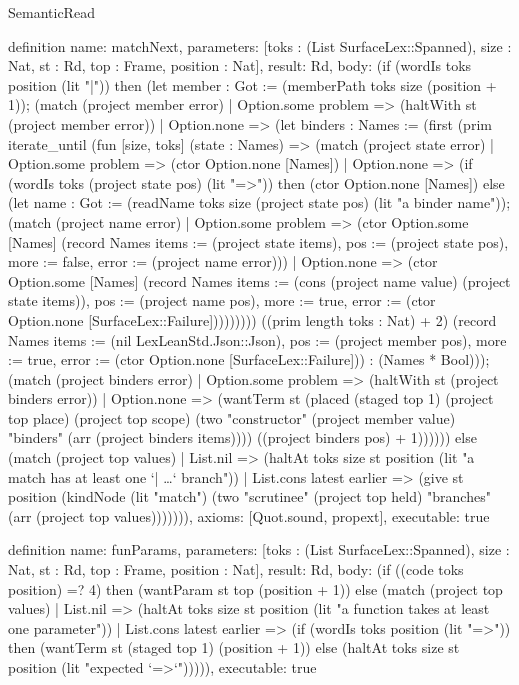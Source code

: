 \begin{lexlean}{SemanticRead}
\begin{semanticmodule}
{definition{
  name: matchNext,
  parameters: [toks : (List SurfaceLex::Spanned), size : Nat, st : Rd, top : Frame, position : Nat],
  result: Rd,
  body: (if (wordIs toks position (lit "|")) then (let member : Got := (memberPath toks size (position + 1)); (match (project member error)
    | Option.some problem => (haltWith st (project member error))
    | Option.none => (let binders : Names := (first (prim iterate_until (fun [size, toks] (state : Names) => (match (project state error)
      | Option.some problem => (ctor Option.none [Names])
      | Option.none => (if (wordIs toks (project state pos) (lit "=>")) then (ctor Option.none [Names]) else (let name : Got := (readName toks size (project state pos) (lit "a binder name")); (match (project name error)
        | Option.some problem => (ctor Option.some [Names] (record Names {items := (project state items), pos := (project state pos), more := false, error := (project name error)}))
        | Option.none => (ctor Option.some [Names] (record Names {items := (cons (project name value) (project state items)), pos := (project name pos), more := true, error := (ctor Option.none [SurfaceLex::Failure])}))))))) ((prim length toks : Nat) + 2) (record Names {items := (nil LexLeanStd.Json::Json), pos := (project member pos), more := true, error := (ctor Option.none [SurfaceLex::Failure])}) : (Names * Bool))); (match (project binders error)
      | Option.some problem => (haltWith st (project binders error))
      | Option.none => (wantTerm st (placed (staged top 1) (project top place) (project top scope) (two "constructor" (project member value) "binders" (arr (project binders items)))) ((project binders pos) + 1)))))) else (match (project top values)
    | List.nil => (haltAt toks size st position (lit "a match has at least one `| …` branch"))
    | List.cons latest earlier => (give st position (kindNode (lit "match") (two "scrutinee" (project top held) "branches" (arr (project top values))))))),
  axioms: [Quot.sound, propext],
  executable: true
}

definition{
  name: funParams,
  parameters: [toks : (List SurfaceLex::Spanned), size : Nat, st : Rd, top : Frame, position : Nat],
  result: Rd,
  body: (if ((code toks position) =? 4) then (wantParam st top (position + 1)) else (match (project top values)
    | List.nil => (haltAt toks size st position (lit "a function takes at least one parameter"))
    | List.cons latest earlier => (if (wordIs toks position (lit "=>")) then (wantTerm st (staged top 1) (position + 1)) else (haltAt toks size st position (lit "expected `=>`"))))),
  executable: true
}

}
\end{semanticmodule}
\end{lexlean}
